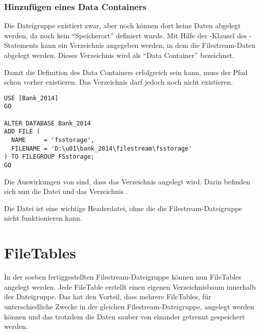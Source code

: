         \subsubsection{Hinzufügen eines Data Containers}
          Die Dateigruppe  existiert zwar, aber noch
          können dort keine Daten abgelegt werden, da noch kein
          \enquote{Speicherort} definiert wurde. Mit Hilfe der
          -Klausel des -Statements kann ein Verzeichnis angegeben werden, in dem die
          Filestream-Daten abgelegt werden. Dieses Verzeichnis wird als
          \enquote{Data Container} bezeichnet.
          \begin{merke}
            Damit die Definition des Data Containers erfolgreich sein kann, muss der
            Pfad  schon vorher existieren. Das
            Verzeichnis  darf jedoch noch nicht existieren.
          \end{merke}
\clearpage
          \begin{lstlisting}[language=ms_sql, caption={Einen Data-Container
          hinzufügen}, label=admin04_02]
USE [Bank_2014]
GO

ALTER DATABASE Bank_2014
ADD FILE (
  NAME     = 'fsstorage',
  FILENAME = 'D:\u01\bank_2014\filestream\fsstorage'
) TO FILEGROUP FSstorage;
GO
          \end{lstlisting}
          Die Auswirkungen von  sind, dass das Verzeichnis
           angelegt wird. Darin befinden sich nun die Datei
           und das Verzeichnis .
          \begin{merke}
            Die Datei  ist eine wichtige Headerdatei,
            ohne die die Filestream-Dateigruppe nicht funktionieren kann.
          \end{merke}
    \section{FileTables}
      In der soeben fertiggestellten Filestream-Dateigruppe können nun
      FileTables angelegt werden. Jede FileTable erstellt einen eigenen
      Verzeichnisbaum innerhalb der Dateigruppe. Das hat den Vorteil, dass
      mehrere FileTables, für unterschiedliche Zwecke in der gleichen
      Filestream-Dateigruppe, angelegt werden können und das trotzdem die Daten
      sauber von einander getrennt gespeichert werden.
